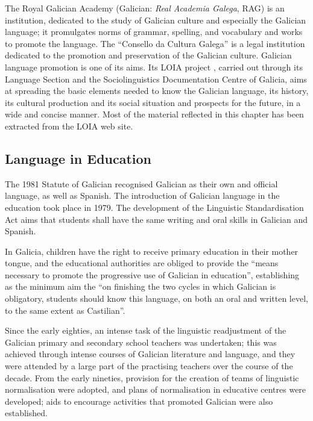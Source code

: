 \begin{multicols}{2}
\begin{itemize}
\begin{multicols}{2}
   The Royal Galician Academy \cite{GAL-Nota11} (Galician: \textit{Real Academia Galega}, RAG) is an institution, dedicated to the study of Galician culture and especially the Galician language; it promulgates norms of grammar, spelling, and vocabulary and works to promote the language. 
The “Consello da Cultura Galega” \cite{GAL-Nota12}  is a legal institution dedicated to the promotion and preservation of the Galician culture. Galician language promotion is one of its aims. Its LOIA project \cite{GAL-Nota13}, carried out through its Language Section and the Sociolinguistics Documentation Centre of Galicia, aims at spreading the basic elements needed to know the Galician language, its history, its cultural production and its social situation and prospects for the future, in a wide and concise manner. Most of the material reflected in this chapter has been extracted from the LOIA web site.

\subsection{Language in Education}

    The 1981 Statute of Galician recognised Galician as their own and official language, as well as Spanish. The introduction of Galician language in the education took place in 1979. The development of the Linguistic Standardisation Act aims that students shall have the same writing and oral skills in Galician and Spanish. 

In Galicia, children have the right to receive primary education in their mother tongue, and the educational authorities are obliged to provide the “means necessary to promote the progressive use of Galician in education”, establishing as the minimum aim the “on finishing the two cycles in which Galician is obligatory, students should know this language, on both an oral and written level, to the same extent as Castilian”. 

Since the early eighties, an intense task of the linguistic readjustment of the Galician primary and secondary school teachers was undertaken; this was achieved through intense courses of Galician literature and language, and they were attended by a large part of the practising teachers over the course of the decade. From the early nineties, provision for the creation of teams of linguistic normalisation were adopted, and plans of normalisation in educative centres were developed; aids to encourage activities that promoted Galician were also established.


\end{multicols}
\end{itemize}
\end{multicols}
